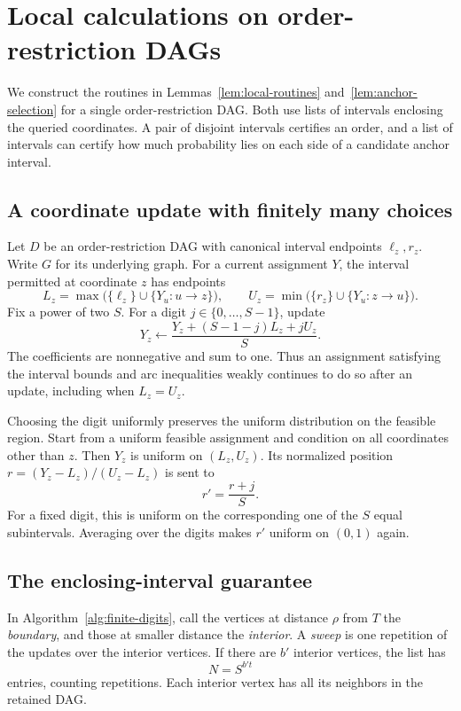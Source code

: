 \section{Local calculations on order-restriction DAGs}\label{sec:oracle}

We construct the routines in Lemmas~\ref{lem:local-routines}
and~\ref{lem:anchor-selection} for a single order-restriction DAG. Both use lists of intervals enclosing the
queried coordinates. A pair of disjoint intervals certifies an order, and a list
of intervals can certify how much probability lies on each side of a
candidate anchor interval.

\subsection{A coordinate update with finitely many choices}

Let $D$ be an order-restriction DAG with canonical interval endpoints
$\ell_z,r_z$. Write $G$ for its underlying graph. For a current assignment $Y$, the interval permitted at coordinate $z$ has endpoints
\[
L_z=\max\bigl(\{\ell_z\}\cup\{Y_u:u\to z\}\bigr),\qquad
U_z=\min\bigl(\{r_z\}\cup\{Y_u:z\to u\}\bigr).
\]
Fix a power of two $S$. For a digit $j\in\{0,\ldots,S-1\}$, update
\begin{equation}\label{eq:digit-update}
Y_z\gets\frac{Y_z+(S-1-j)L_z+jU_z}{S}.
\end{equation}
The coefficients are nonnegative and sum to one. Thus an assignment
satisfying the interval bounds and arc inequalities weakly continues to
do so after an update, including when $L_z=U_z$.

Choosing the digit uniformly preserves the uniform distribution on the
feasible region. Start from a uniform feasible assignment and condition
on all coordinates other than $z$. Then $Y_z$ is uniform
on $(L_z,U_z)$. Its normalized position
$r=(Y_z-L_z)/(U_z-L_z)$ is sent to
\[
r'=\frac{r+j}{S}.
\]
For a fixed digit, this is uniform on the corresponding one of the $S$
equal subintervals. Averaging over the digits makes $r'$ uniform on
$(0,1)$ again.

\subsection{The enclosing-interval guarantee}

In Algorithm~\ref{alg:finite-digits}, call the vertices at distance
$\rho$ from $T$ the \emph{boundary}, and those at smaller distance the
\emph{interior}. A \emph{sweep} is one repetition of the updates over
the interior vertices. If there are $b'$ interior vertices, the list has
\begin{equation}\label{eq:digit-count}
N=S^{b't}
\end{equation}
entries, counting repetitions. Each interior vertex has all its neighbors
in the retained DAG.

